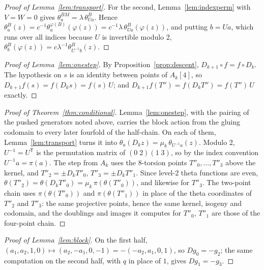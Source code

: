 \documentclass[version=preprint]{iacrcc}
\begin{document}
\begin{proof}[Proof of Lemma~\ref{lem:transport}]
        For the second, Lemma~\ref{lem:indexperm} with $V = W = 0$ gives
        $\theta^{BM}_a = \lambda\, \theta^B_{Ua}$. Hence $\theta^B_a(z) = c^{-1}
        \theta^{\varphi(B)}_a(\varphi(z)) = c^{-1}\lambda\, \theta^B_{Ua}
        (\varphi(z))$, and putting $b = Ua$, which runs over all indices because
        $U$ is invertible modulo 2, $\theta^B_b(\varphi(z)) = c \lambda^{-1}
        \theta^B_{U^{-1} b}(z)$.
    \end{proof}

    \begin{proof}[Proof of Lemma~\ref{lem:onestep}]
        By Proposition~\ref{prop:descent}, $D_{k+1} \circ f = f \circ D_k$. The
        hypothesis on $s$ is an identity between points of $A_k[4]$, so
        $D_{k+1} f(s) = f(D_k s) = f(s)\, U$; and $D_{k+1} f(T'') = f(D_k T'') =
        f(T'')\, U$ exactly.
    \end{proof}

    \begin{proof}[Proof of Theorem~\ref{thm:conditional}]
        Lemma~\ref{lem:onestep}, with the pairing of the pushed generators noted
        above, carries the block action from the gluing codomain to every later
        fourfold of the half-chain. On each of them, Lemma~\ref{lem:transport}
        turns it into $\theta_a(D_k z) = \mu_k\, \theta_{U^{-1} a}(z)$. Modulo 2,
        $U^{-1} = U^{\mathsf T}$ is the permutation matrix of $(0\;2)(1\;3)$, so
        by the index convention $U^{-1} a = \pi(a)$. The step from $A_k$ uses the
        8-torsion points $T''_0, \ldots, T''_3$ above the kernel, and $T''_2 = \pm
        D_k T''_0$, $T''_3 = \pm D_k T''_1$. Since level-2 theta functions are
        even, $\theta(T''_2) = \theta(D_k T''_0) = \mu_k\, \pi(\theta(T''_0))$,
        and likewise for $T''_3$. The two-point chain uses
        $\pi(\theta(T''_0))$ and $\pi(\theta(T''_1))$ in place of the theta
        coordinates of $T''_2$ and $T''_3$: the same projective points, hence the
        same kernel, isogeny and codomain, and the doublings and images it
        computes for $T''_0$, $T''_1$ are those of the four-point chain.
    \end{proof}

    \begin{proof}[Proof of Lemma~\ref{lem:block}]
        On the first half, $(a_1, a_2, 1, 0) \mapsto (a_2, -a_1, 0, -1) = -(-a_2,
        a_1, 0, 1)$, so $D g_0 = -g_2$; the same computation on the second half,
        with $q$ in place of $1$, gives $D g_1 = -g_3$.
    \end{proof}
\end{document}
